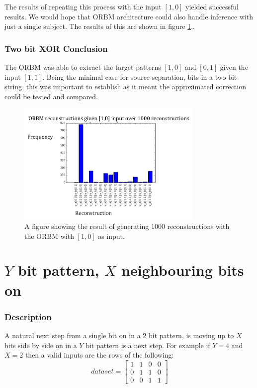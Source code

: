 The results of repeating this process with the input $[1,0]$ yielded successful results. We would hope that ORBM architecture could also handle inference with just a single subject. The results of this are shown in
figure \ref{F:Two-Bit-RBM-Inference-Results-2}..

\subsubsection{Two bit XOR Conclusion}

The ORBM was able to extract the target patterns $[1,0]$ and $[0,1]$ given the input $[1,1]$. Being the minimal case for source separation, bits in a two bit string, this was important to establish as it meant the approximated correction could be tested and compared. 

\begin{figure}[h]
  \begin{center}
    \includegraphics[width=0.8\textwidth]{Assets/ORBM-Reconstructions-[1,1].png}
  \end{center}
  \caption{A figure showing the result of generating 1000 reconstructions with the ORBM with $[1,0]$ as input.}

  \label{F:Two-Bit-RBM-Inference-Results-2}
\end{figure}

\section{$Y$ bit pattern, $X$ neighbouring bits on}

\subsubsection{Description}
A natural next step from a single bit on in a 2 bit pattern, is moving up to $X$  bits side by side on in a $Y$ bit pattern is a next step. For example if $Y = 4 $ and $ X = 2 $ then a valid inputs are the rows of the following:
$$ dataset =
\begin{bmatrix}
  1 & 1 & 0 & 0 \\
  0 & 1 & 1 & 0 \\
  0 & 0 & 1 & 1
\end{bmatrix}
$$


